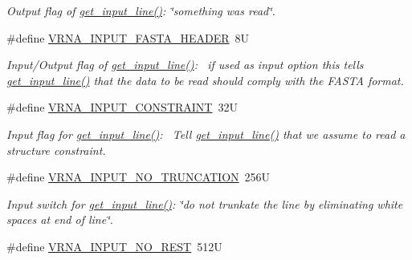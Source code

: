 \begin{DoxyCompactItemize}
\begin{DoxyCompactList}\small\item\em Output flag of \hyperlink{group__utils_ga8ef1835eb83f542396f59f0b205965e5}{get\+\_\+input\+\_\+line()}\+: {\itshape \char`\"{}something was read\char`\"{}}. \end{DoxyCompactList}\item 
\#define \hyperlink{group__utils_ga2f0d8069e93d3ac54d9320d6bdb8e7e7}{V\+R\+N\+A\+\_\+\+I\+N\+P\+U\+T\+\_\+\+F\+A\+S\+T\+A\+\_\+\+H\+E\+A\+D\+E\+R}~8\+U
\begin{DoxyCompactList}\small\item\em Input/\+Output flag of \hyperlink{group__utils_ga8ef1835eb83f542396f59f0b205965e5}{get\+\_\+input\+\_\+line()}\+:~\newline
if used as input option this tells \hyperlink{group__utils_ga8ef1835eb83f542396f59f0b205965e5}{get\+\_\+input\+\_\+line()} that the data to be read should comply with the F\+A\+S\+T\+A format. \end{DoxyCompactList}\item 
\#define \hyperlink{group__utils_gac08a9df45b9721b97a47dbfe7a6e5f85}{V\+R\+N\+A\+\_\+\+I\+N\+P\+U\+T\+\_\+\+C\+O\+N\+S\+T\+R\+A\+I\+N\+T}~32\+U
\begin{DoxyCompactList}\small\item\em Input flag for \hyperlink{group__utils_ga8ef1835eb83f542396f59f0b205965e5}{get\+\_\+input\+\_\+line()}\+:~\newline
Tell \hyperlink{group__utils_ga8ef1835eb83f542396f59f0b205965e5}{get\+\_\+input\+\_\+line()} that we assume to read a structure constraint. \end{DoxyCompactList}\item 
\hypertarget{group__utils_ga086742158293217a46ae2f71bb296937}{}\#define \hyperlink{group__utils_ga086742158293217a46ae2f71bb296937}{V\+R\+N\+A\+\_\+\+I\+N\+P\+U\+T\+\_\+\+N\+O\+\_\+\+T\+R\+U\+N\+C\+A\+T\+I\+O\+N}~256\+U\label{group__utils_ga086742158293217a46ae2f71bb296937}

\begin{DoxyCompactList}\small\item\em Input switch for \hyperlink{group__utils_ga8ef1835eb83f542396f59f0b205965e5}{get\+\_\+input\+\_\+line()}\+: {\itshape \char`\"{}do not trunkate the line by eliminating white spaces at end of line\char`\"{}}. \end{DoxyCompactList}\item 
\hypertarget{group__utils_ga7a2e8c50a0c7ce82e60da1016e1367fd}{}\#define \hyperlink{group__utils_ga7a2e8c50a0c7ce82e60da1016e1367fd}{V\+R\+N\+A\+\_\+\+I\+N\+P\+U\+T\+\_\+\+N\+O\+\_\+\+R\+E\+S\+T}~512\+U\label{group__utils_ga7a2e8c50a0c7ce82e60da1016e1367fd}


\end{DoxyCompactItemize}
